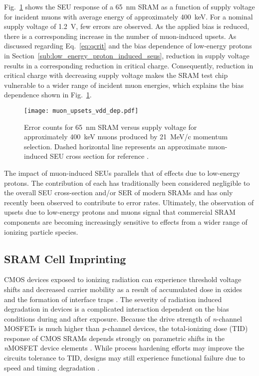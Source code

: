 Fig.~\ref{fig:muon_upsets_bias_dep} shows the SEU response of a 65~nm SRAM as a function of supply voltage for incident muons with average energy of approximately 400~keV. 
For a nominal supply voltage of 1.2~V, few errors are observed. 
As the applied bias is reduced, there is a corresponding increase in the number of muon-induced upsets. 
As discussed regarding Eq.~\ref{eq:qcrit} and the bias dependence of low-energy protons in Section~\ref{sub:low_energy_proton_induced_seus}, reduction in supply voltage results in a corresponding reduction in critical charge.
Consequently, reduction in critical charge with decreasing supply voltage makes the SRAM test chip vulnerable to a wider range of incident muon energies, which explains the bias dependence shown in Fig.~\ref{fig:muon_upsets_bias_dep}.
\begin{figure}[htbp]
    \begin{center}
        \texttt{[image: muon\_upsets\_vdd\_dep.pdf]}
    \end{center}
    \caption[Error counts for 65~nm SRAM versus supply voltage for approximately 400~keV muons produced by 21~MeV/c momentum selection. Dashed horizontal line represents an approximate muon-induced SEU cross section for reference.]{Error counts for 65~nm SRAM versus supply voltage for approximately 400~keV muons produced by 21~MeV/c momentum selection. Dashed horizontal line represents an approximate muon-induced SEU cross section for reference \cite{Sierawski:2010cj}.}
    \label{fig:muon_upsets_bias_dep}
\end{figure}

The impact of muon-induced SEUs parallels that of effects due to low-energy protons.
The contribution of each has traditionally been considered negligible to the overall SEU cross-section and/or SER of modern SRAMs and has only recently been observed to contribute to error rates.
Ultimately, the observation of upsets due to low-energy protons and muons signal that commercial SRAM components are becoming increasingly sensitive to effects from a wider range of ionizing particle species.


\subsection{SRAM Cell Imprinting} %
\label{sub:sram_cell_imprinting}
CMOS devices exposed to ionizing radiation can experience threshold voltage shifts and decreased carrier mobility as a result of accumulated dose in oxides and the formation of interface traps \cite{Dressendorfer:1981kg, Galloway:1990kh, Fleetwood:1993vs, Fleetwood:1995tk}. 
The severity of radiation induced degradation in devices is a complicated interaction dependent on the bias conditions during and after exposure. 
Because the drive strength of \emph{n}-channel MOSFETs is much higher than \emph{p}-channel devices, the total-ionizing dose (TID) response of CMOS SRAMs depends strongly on parametric shifts in the \emph{n}MOSFET device elements \cite{Schott:1987cx,Fleetwood:1987cfa}. 
While process hardening efforts may improve the circuits tolerance to TID, designs may still experience functional failure due to speed and timing degradation \cite{Fleetwood:1987cfa,Felix:2006jl}.

